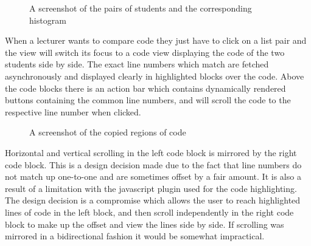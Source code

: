 \documentclass[11pt,a4paper]{article}
\begin{document}
\begin{figure}[H]
  \caption{A screenshot of the pairs of students and the corresponding histogram}
  \label{fig:pairshistogram}
\end{figure}

When a lecturer wants to compare code they just have to click on a list pair and the view will switch its focus to a code view displaying the code of the two students side by side. The exact line numbers which match are fetched asynchronously and displayed clearly in highlighted blocks over the code. Above the code blocks there is an action bar which contains dynamically rendered buttons containing the common line numbers, and will scroll the code to the respective line number when clicked.

\begin{figure}[H]
  \caption{A screenshot of the copied regions of code}
  \label{fig:codeview}
\end{figure}

Horizontal and vertical scrolling in the left code block is mirrored by the right code block. This is a design decision made due to the fact that line numbers do not match up one-to-one and are sometimes offset by a fair amount. It is also a result of a limitation with the javascript plugin used for the code highlighting. The design decision is a compromise which allows the user to reach highlighted lines of code in the left block, and then scroll independently in the right code block to make up the offset and view the lines side by side. If scrolling was mirrored in a bidirectional fashion it would be somewhat impractical.
\end{document}
